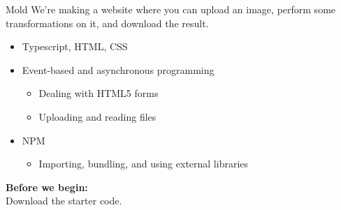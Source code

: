 \documentclass[../index.tex]{subfiles}
\begin{document}

\renewcommand{\currenttitle}{Mold}
\begin{frame}[fragile]{\currenttitle}
  We're making a website where you can upload an image, perform some
  transformations on it, and download the result.

  \begin{itemize}
    \item Typescript, HTML, CSS
    \item Event-based and asynchronous programming
      \begin{itemize} 
        \item Dealing with HTML5 forms
        \item Uploading and reading files
      \end{itemize}
    \item NPM
      \begin{itemize}
        \item Importing, bundling, and using external libraries
      \end{itemize}
  \end{itemize}

  \textbf{Before we begin:} \\
  Download the starter code\footnotemark{}.

\end{frame}

\end{document}
